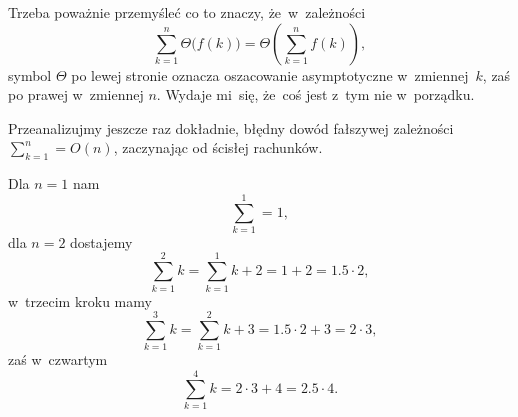 \documentclass[a4paper,11pt]{article}
\numberwithin{equation}{section}
\begin{document}
\VerSpaceFour




















\noindent
{} Trzeba poważnie przemyśleć co to znaczy, że~w~zależności
\begin{equation}
  \label{eq:CormenAtAl-WprowadzenieDoAlgorytmow-10}
  \sum_{ k = 1 }^{ n } \Theta\big( f( k ) \big) =
  \Theta\left( \sum_{ k = 1 }^{ n } f( k ) \right),
\end{equation}
symbol $\Theta$ po lewej stronie oznacza oszacowanie asymptotyczne
w~zmiennej~$k$, zaś po prawej w~zmiennej $n$. Wydaje mi~się, że~coś jest
z~tym nie w~porządku.

\VerSpaceFour





\noindent
{} Przeanalizujmy jeszcze raz dokładnie, błędny dowód fałszywej
zależności $\sum_{ k = 1 }^{ n } = O( n )$, zaczynając od ścisłej rachunków.

Dla $n = 1$ nam
\begin{equation}
  \label{eq:CormenAtAl-WprowadzenieDoAlgorytmow-11}
  \sum_{ k = 1 }^{ 1 } = 1,
\end{equation}
dla $n = 2$ dostajemy
\begin{equation}
  \label{eq:CormenAtAl-WprowadzenieDoAlgorytmow-12}
  \sum_{ k = 1 }^{ 2 } k = \sum_{ k = 1 }^{ 1 } k + 2 = 1 + 2 = 1.5 \cdot 2,
\end{equation}
w~trzecim kroku mamy
\begin{equation}
  \label{eq:CormenAtAl-WprowadzenieDoAlgorytmow-13}
  \sum_{ k = 1 }^{ 3 } k = \sum_{ k = 1 }^{ 2 } k + 3 = 1.5 \cdot 2 + 3 = 2 \cdot 3,
\end{equation}
zaś w~czwartym
\begin{equation}
  \label{eq:CormenAtAl-WprowadzenieDoAlgorytmow-14}
  \sum_{ k = 1 }^{ 4 } k = 2 \cdot 3 + 4 = 2.5 \cdot 4.
\end{equation}
\end{document}
